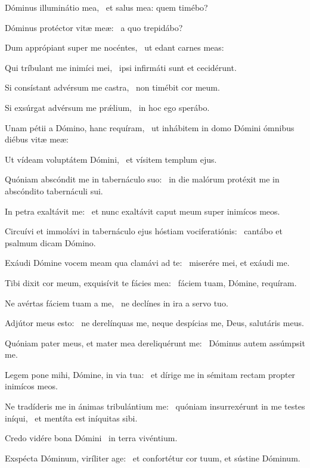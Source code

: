 \item Dóminus illuminátio mea,~\psstar{} et salus mea: quem timébo?

\item Dóminus protéctor vitæ meæ:~\psstar{} a quo trepidábo?

\item Dum apprópiant super me nocéntes,~\psstar{} ut edant carnes meas:

\item Qui tríbulant me inimíci mei,~\psstar{} ipsi infirmáti sunt et cecidérunt.

\item Si consístant advérsum me castra,~\psstar{} non timébit cor meum.

\item Si exsúrgat advérsum me prǽlium,~\psstar{} in hoc ego sperábo.

\item Unam pétii a Dómino, hanc requíram,~\psstar{} ut inhábitem in domo Dómini ómnibus diébus vitæ meæ:

\item Ut vídeam voluptátem Dómini,~\psstar{} et vísitem templum ejus.

\item Quóniam abscóndit me in tabernáculo suo:~\psstar{} in die malórum protéxit me in abscóndito tabernáculi sui.

\item In petra exaltávit me:~\psstar{} et nunc exaltávit caput meum super inimícos meos.

\item Circuívi et immolávi in tabernáculo ejus hóstiam vociferatiónis:~\psstar{} cantábo et psalmum dicam Dómino.

\item Exáudi Dómine vocem meam qua clamávi ad te:~\psstar{} miserére mei, et exáudi me.

\item Tibi dixit cor meum, exquisívit te fácies mea:~\psstar{} fáciem tuam, Dómine, requíram.

\item Ne avértas fáciem tuam a me,~\psstar{} ne declínes in ira a servo tuo.

\item Adjútor meus esto:~\psstar{} ne derelínquas me, neque despícias me, Deus, salutáris meus.

\item Quóniam pater meus, et mater mea dereliquérunt me:~\psstar{} Dóminus autem assúmpsit me.

\item Legem pone mihi, Dómine, in via tua:~\psstar{} et dírige me in sémitam rectam propter inimícos meos.

\item Ne tradíderis me in ánimas tribulántium me:~\pscross{} quóniam insurrexérunt in me testes iníqui,~\psstar{} et mentíta est iníquitas sibi.

\item Credo vidére bona Dómini~\psstar{} in terra vivéntium.

\item Exspécta Dóminum, viríliter age:~\psstar{} et confortétur cor tuum, et sústine Dóminum.